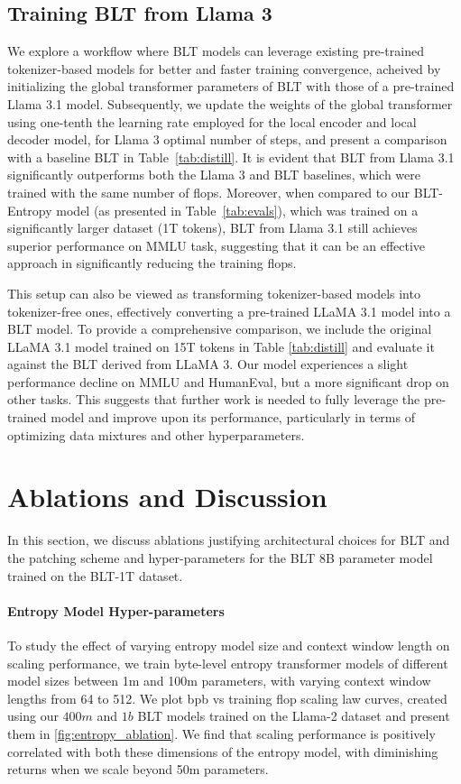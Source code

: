 \subsection{Training {\textsc BLT} from Llama 3}
\label{sec:distillation}
We explore a workflow where {\textsc BLT} models can leverage existing pre-trained tokenizer-based models for better and faster training convergence, acheived by initializing the global transformer parameters of {\textsc BLT} with those of a pre-trained Llama 3.1 model. Subsequently, we update the weights of the global transformer using one-tenth the learning rate employed for the local encoder and local decoder model, for Llama 3 optimal number of steps, and present a comparison with a baseline {\textsc BLT} in Table~\ref{tab:distill}. It is evident that {\textsc BLT} from Llama 3.1 significantly outperforms both the Llama 3 and {\textsc BLT} baselines, which were trained with the same number of flops. Moreover, when compared to our {\textsc BLT}-Entropy model (as presented in Table~\ref{tab:evals}), which was trained on a significantly larger dataset (1T tokens), {\textsc BLT} from Llama 3.1 still achieves superior performance on MMLU task, suggesting that it can be an effective approach in significantly reducing the training flops. 

This setup can also be viewed as transforming tokenizer-based models into tokenizer-free ones, effectively converting a pre-trained LLaMA 3.1 model into a {\textsc BLT} model. To provide a comprehensive comparison, we include the original LLaMA 3.1 model trained on 15T tokens in Table \ref{tab:distill} and evaluate it against the {\textsc BLT} derived from LLaMA 3. Our model experiences a slight performance decline on MMLU and HumanEval, but a more significant drop on other tasks. This suggests that further work is needed to fully leverage the pre-trained model and improve upon its performance, particularly in terms of optimizing data mixtures and other hyperparameters.

\section{Ablations and Discussion}
\label{section:ablations}
In this section, we discuss ablations justifying architectural choices for {\textsc BLT} and the patching scheme and hyper-parameters for the {\textsc BLT} 8B parameter model trained on the {\textsc BLT}-1T dataset.

\paragraph{Entropy Model Hyper-parameters} To study the effect of varying entropy model size and context window length on scaling performance, we train byte-level entropy transformer models of different model sizes between 1m and 100m parameters, with varying context window lengths from 64 to 512. We plot bpb vs training flop scaling law curves, created using our $400m$ and $1b$ {\textsc BLT} models trained on the Llama-2 dataset and present them in \autoref{fig:entropy_ablation}. We find that scaling performance is positively correlated with both these dimensions of the entropy model, with diminishing returns when we scale beyond 50m parameters. 

